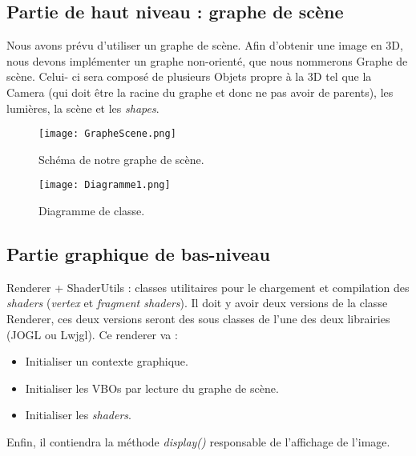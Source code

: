 \documentclass[11pt]{report}
\begin{document}
\subsection{Partie de haut niveau : graphe de scène}
Nous avons prévu d'utiliser un graphe de scène. 
Afin d'obtenir une image en 3D, nous devons implémenter un graphe non-orienté, que nous nommerons Graphe de scène. Celui- ci sera composé de plusieurs Objets propre à la 3D tel que la Camera (qui doit être la racine du graphe et donc ne pas avoir de parents), les lumières, la scène et les  \textit{shapes}. 

\begin{figure}[h!]
  \caption{Schéma de notre graphe de scène.}
  \centering
    \texttt{[image: GrapheScene.png]} 
\end{figure}
 
\begin{figure}[h!]
  \caption{Diagramme de classe.}
  \centering
    \texttt{[image: Diagramme1.png]}
\end{figure}
 




\subsection{Partie graphique de bas-niveau}
Renderer + ShaderUtils : classes utilitaires pour le chargement et compilation des \textit{shaders} (\textit{vertex} et \textit{fragment shaders}).
Il doit y avoir deux versions de la classe Renderer, ces deux versions seront des sous classes de l'une des deux librairies (JOGL ou Lwjgl).
Ce renderer va :
\begin{itemize}
\item Initialiser un contexte graphique. %
\item Initialiser les VBOs par lecture du graphe de scène.
\item Initialiser les \textit{shaders}. %
\end{itemize}
Enfin, il contiendra la méthode \textit{display()} responsable de l'affichage de l'image.



  
  
\end{document}
